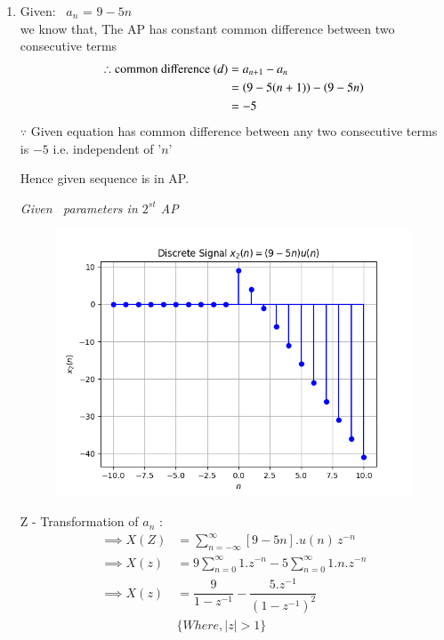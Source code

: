 \documentclass[journal,12pt,twocolumn]{IEEEtran}
\theoremstyle{remark}
\begin{document}
\begin{enumerate} [label=(\roman*)]
    \item Given: $\,$ $a_n$ = $9 - 5n$ \\
    we know that, The AP has constant common difference between two consecutive terms
    \begin{align}
        \therefore \text{common difference } (d) &= a_{n+1} - a_n \\
        &= \left(9-5(n+1)\right) - \left(9-5n\right) \nonumber\\
        &= -5
    \end{align}
   $\because$ Given equation has common difference between any two consecutive terms is $-5$ i.e. independent of '$n$'
   \begin{center}
       Hence given sequence is in AP.
   \end{center}

    \begin{table}[htbp] 
    \centering
    
    \vspace{0.2cm}
    \caption{\normalsize\textsl{Given \, parameters in $2^{st}$ AP}}
    \label{given parameters list}
    \end{table}

    \begin{figure}[!h] 
    \centering
    \includegraphics[width=\columnwidth]{figs/signal_x2.png}
    \caption{}
    \label{fig:Graph2}
    \end{figure}
     Z - Transformation of $a_n$ :
    \begin{align}
        \implies  X(Z) &= \sum_{n = -\infty}^{\infty}[9 - 5n].u(n) \, z^{-n} \\
        \implies X(z) &= 9 \sum_{n = 0}^{\infty} 1.z^{-n} - 5 \sum_{n = 0}^{\infty} 1.n.z^{-n}\\
        \implies X(z) &= \dfrac{9}{1-z^{-1}} - \dfrac{5.z^{-1}}{(1-z^{-1})^2}\\
        &\{ Where, |z|>1\} \nonumber
    \end{align}

\end{enumerate}
\end{document}
